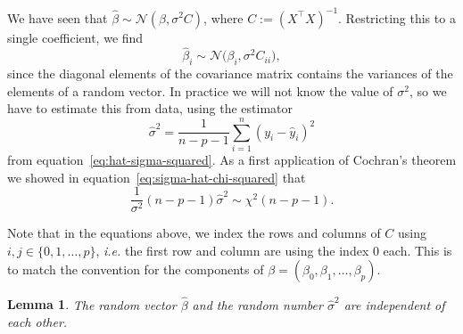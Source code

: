 \documentclass[
  a4paper,
]{article}
\newtheorem{lemma}{Lemma}[section]
\theoremstyle{definition}
\theoremstyle{definition}
\theoremstyle{definition}
\theoremstyle{definition}
\theoremstyle{remark}
\begin{document}
We have seen that \(\hat\beta \sim \mathcal{N}(\beta, \sigma^2 C)\), where
\(C := (X^\top X)^{-1}\). Restricting this to a single coefficient, we find
\begin{equation*}
  \hat\beta_i
  \sim \mathcal{N}\bigl( \beta_i, \sigma^2 C_{ii} \bigr),
\end{equation*}
since the diagonal elements of the covariance matrix contains the
variances of the elements of a random vector. In practice we will not
know the value of \(\sigma^2\), so we have to estimate this from data,
using the estimator
\begin{equation*}
  \hat\sigma^2
  = \frac{1}{n-p-1} \sum_{i=1}^n (y_i - \hat y_i)^2
\end{equation*}
from equation~\eqref{eq:hat-sigma-squared}. As a first application of
Cochran's theorem we showed in equation~\eqref{eq:sigma-hat-chi-squared}
that
\begin{equation*}
  \frac{1}{\sigma^2} (n - p - 1) \hat\sigma^2
  \sim \chi^2(n - p - 1).
\end{equation*}

Note that in the equations above, we index the rows and columns of \(C\)
using \(i,j\in \{0, 1, \ldots, p\}\), \emph{i.e.} the first row and column are
using the index 0 each. This is to match the convention for the
components of \(\beta = (\beta_0, \beta_1, \ldots, \beta_p)\).

\begin{lemma}
\protect\hypertarget{lem:hat-beta-sigma-indep}{}\label{lem:hat-beta-sigma-indep}The random vector \(\hat\beta\) and the random number
\(\hat\sigma^2\) are independent of each other.
\end{lemma}
\end{document}
